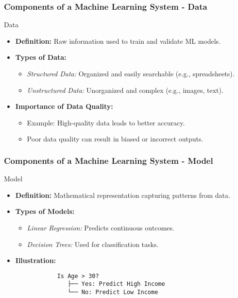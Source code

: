 \documentclass[aspectratio=169]{beamer}
\begin{document}
\begin{frame}[fragile]
    \frametitle{Components of a Machine Learning System - Data}
    \begin{block}{Data}
        \begin{itemize}
            \item \textbf{Definition:} Raw information used to train and validate ML models.
            \item \textbf{Types of Data:}
            \begin{itemize}
                \item \textit{Structured Data:} Organized and easily searchable (e.g., spreadsheets).
                \item \textit{Unstructured Data:} Unorganized and complex (e.g., images, text).
            \end{itemize}
            \item \textbf{Importance of Data Quality:}
            \begin{itemize}
                \item Example: High-quality data leads to better accuracy.
                \item Poor data quality can result in biased or incorrect outputs.
            \end{itemize}
        \end{itemize}
    \end{block}
\end{frame}

\begin{frame}[fragile]
    \frametitle{Components of a Machine Learning System - Model}
    \begin{block}{Model}
        \begin{itemize}
            \item \textbf{Definition:} Mathematical representation capturing patterns from data.
            \item \textbf{Types of Models:}
            \begin{itemize}
                \item \textit{Linear Regression:} Predicts continuous outcomes.
                \item \textit{Decision Trees:} Used for classification tasks.
            \end{itemize}
            \item \textbf{Illustration:}
            \begin{verbatim}
            Is Age > 30?
               ├── Yes: Predict High Income
               └── No: Predict Low Income
            \end{verbatim}
        \end{itemize}
    \end{block}
\end{frame}
\end{document}
